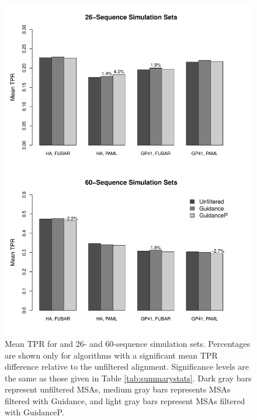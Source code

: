 \documentclass[11pt]{article}
\begin{document}
\bigskip

\begin{figure}[H]
\centerline{\includegraphics[width=4.75in]{Figures/barplot.pdf}}
\caption{\label{barplot} Mean TPR for and 26- and  60-sequence simulation sets. Percentages are shown only for algorithms with a significant mean TPR difference relative to the unfiltered alignment. Significance levels are the same as those given in Table \ref{tab:summarystats}. Dark gray bars represent unfiltered MSAs, medium gray bars represents MSAs filtered with Guidance, and light gray bars represent MSAs filtered with GuidanceP.}
\end{figure}

\bigskip
\end{document}
